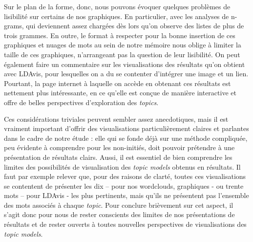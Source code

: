 \documentclass[letterpaper,portrait,12pt]{article}
\begin{document}
\textcolor[rgb]{0.000,0.000,0.000}{	Sur le plan de la forme, donc, nous pouvons \'{e}voquer quelques probl\`{e}mes de lisibilit\'{e} sur certains de nos graphiques. En particulier, avec les analyses de n-grams, qui deviennent assez charg\'{e}es d\`{e}s lors qu'on observe des listes de plus de trois grammes. En outre, le format \`{a} respecter pour la bonne insertion de ces graphiques et nuages de mots au sein de notre m\'{e}moire nous oblige \`{a} limiter la taille de ces graphiques, n'arrangeant pas la question de leur lisibilit\'{e}. On peut \'{e}galement faire un commentaire sur les visualisations des r\'{e}sultats qu'on obtient avec LDAvis, pour lesquelles on a du se contenter d'int\'{e}grer une image et un lien. Pourtant, la page internet \`{a} laquelle on acc\`{e}de en obtenant ces r\'{e}sultats est nettement plus int\'{e}ressante, en ce qu'elle est con\c{c}ue de mani\`{e}re interactive et offre de belles perspectives d'exploration des }\emph{\textcolor[rgb]{0.000,0.000,0.000}{topics}}\textcolor[rgb]{0.000,0.000,0.000}{.}





\textcolor[rgb]{0.000,0.000,0.000}{	Ces consid\'{e}rations triviales peuvent sembler assez anecdotiques, mais il est vraiment important d'offrir des visualisations particuli\`{e}rement claires et parlantes dans le cadre de notre \'{e}tude : elle qui se fonde d\'{e}j\`{a} sur une m\'{e}thode compliqu\'{e}e, peu \'{e}vidente \`{a} comprendre pour les non-initi\'{e}s, doit pouvoir pr\'{e}tendre \`{a} une pr\'{e}sentation de r\'{e}sultats clairs. Aussi, il est essentiel de bien comprendre les limites des possibilit\'{e}s de visualisation des }\emph{\textcolor[rgb]{0.000,0.000,0.000}{topic models}}\textcolor[rgb]{0.000,0.000,0.000}{ obtenus en r\'{e}sultats. Il faut par exemple relever que, pour des raisons de clart\'{e}, toutes ces visualisations se contentent de pr\'{e}senter les dix -- pour nos wordclouds, graphiques - ou trente mots -- pour LDAvis - les plus pertinents, mais qu'ils ne pr\'{e}sentent pas l'ensemble des mots associ\'{e}s \`{a} chaque }\emph{\textcolor[rgb]{0.000,0.000,0.000}{topic}}\textcolor[rgb]{0.000,0.000,0.000}{. Pour conclure bri\`{e}vement sur cet aspect, il s'agit donc pour nous de rester conscients des limites de nos pr\'{e}sentations de r\'{e}sultats et de rester ouverts \`{a} toutes nouvelles perspectives de visualisations des }\emph{\textcolor[rgb]{0.000,0.000,0.000}{topic models}}\textcolor[rgb]{0.000,0.000,0.000}{.}
\end{document}
